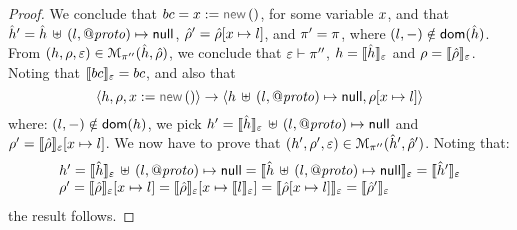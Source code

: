\begin{proof}
\noindent{}
We conclude that $\bcmd = \jvar := \jsilnew()$, for some variable $\jvar$, and that
$\sheap' = \sheap \dunion \hcell{\loc}{\protop}{\jsnull}$, $\sstore' = \sstore[\jvar \mapsto \loc]$, and $\pc' = \pc$, 
 where  $(\loc,-) \notin \domain (\sheap)$. 
 From $(\heap, \store, \senv) \in \smodels{\sheap, \sstore}{\pc''}$, we conclude that  $\senv \vdash \pc''$, $\heap = \semexpr{\sheap}{\senv}$ and $\store = \semexpr{\sstore}{\senv}$. 
Noting that $\symbeval{\bcmd}{\senv} = \bcmd$, and also that 
$$
\semtrans{\heap, \store, \jvar := \jsilnew()}{\heap \dunion \hcell{\loc}{\protop}{\jsnull}, \store[\jvar \mapsto \loc]}
$$
where: $(\loc,-) \notin \domain (\heap)$, we pick $\heap' = \semexpr{\sheap}{\senv} \dunion \hcell{\loc}{\protop}{\jsnull}$ 
and $\store' = \semexpr{\sstore}{\senv}[\jvar \mapsto \loc]$. 
We now have to prove that $(\heap', \store', \senv) \in \smodels{\sheap', \sstore'}{\pc''}$.
Noting that: 
$$
\begin{array}{l}
\heap' = \semexpr{\sheap}{\senv} \dunion \hcell{\loc}{\protop}{\jsnull} = \semexpr{\sheap \dunion \hcell{\loc}{\protop}{\jsnull}}{\senv}   
     = \semexpr{\sheap'}{\senv}  \\
%
\store' = \semexpr{\sstore}{\senv}[\jvar \mapsto \loc] = \semexpr{\sstore}{\senv}[\jvar \mapsto \symbeval{\loc}{\senv}] = 
      \semexpr{\sstore[\jvar \mapsto \loc]}{\senv} = \semexpr{\sstore'}{\senv} 
\end{array}
$$
the result follows. 
\vspace{6pt}


\end{proof}
